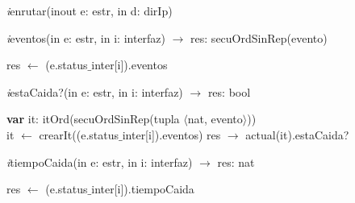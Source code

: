 \textit{i}enrutar(inout e: estr, in d: dirIp)\\
\begin{algorithm}[H]
\BlankLine

\end{algorithm}

\vspace{11pt}

\textit{i}eventos(in e: estr, in i: interfaz) $\longrightarrow$ res: secuOrdSinRep(evento)\\
\begin{algorithm}[H]
\BlankLine
res $\leftarrow$ (e.status$\_$inter[i]).eventos
\end{algorithm}

\vspace{11pt}

\textit{i}estaCaida?(in e: estr, in i: interfaz) $\longrightarrow$ res: bool\\
\begin{algorithm}[H]
\BlankLine
\textbf{var} it: itOrd(secuOrdSinRep(tupla $\langle$nat, evento$\rangle$)) \\
\BlankLine
it $\leftarrow$ crearIt((e.status$\_$inter[i]).eventos) 
\BlankLine
res $\rightarrow$ actual(it).estaCaida? 
\end{algorithm}

\vspace{11pt}

\textit{i}tiempoCaida(in e: estr, in i: interfaz) $\longrightarrow$ res: nat \\
\begin{algorithm}[H]
\BlankLine
res $\leftarrow$ (e.status$\_$inter[i]).tiempoCaida 
\end{algorithm}